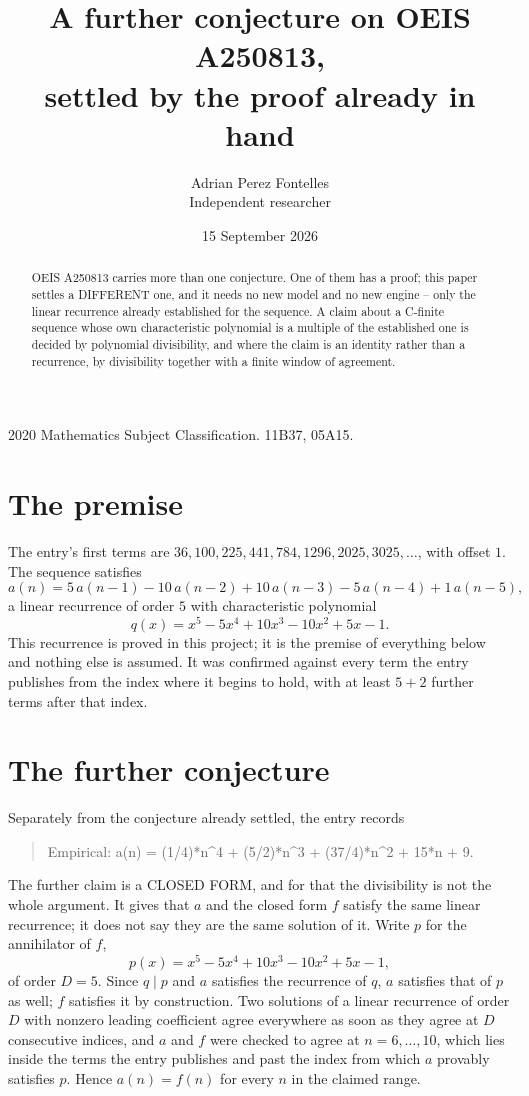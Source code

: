 \documentclass[11pt,a4paper]{article}
\title{A further conjecture on OEIS A250813,\\ \large settled by the proof already in hand}
\author{Adrian Perez Fontelles\\ \small Independent researcher}
\date{15 September 2026}
\theoremstyle{plain}
\theoremstyle{definition}
\begin{document}
\maketitle

\begin{abstract}
OEIS A250813 carries more than one conjecture. One of them has a proof; this paper settles a
DIFFERENT one, and it needs no new model and no new engine -- only the linear recurrence already
established for the sequence. A claim about a C-finite sequence whose own characteristic
polynomial is a multiple of the established one is decided by polynomial divisibility, and where
the claim is an identity rather than a recurrence, by divisibility together with a finite window
of agreement.
\end{abstract}

\noindent\small 2020 Mathematics Subject Classification. 11B37, 05A15.\normalsize

\section{The premise}

The entry's first terms are $36, 100, 225, 441, 784, 1296, 2025, 3025,\dots$, with offset $1$. The sequence satisfies
\[
  a(n)=5\,a(n-1) - 10\,a(n-2) + 10\,a(n-3) - 5\,a(n-4) + 1\,a(n-5) ,
\]
a linear recurrence of order $5$ with characteristic polynomial
\[
  q(x)=x^{5} - 5 x^{4} + 10 x^{3} - 10 x^{2} + 5 x - 1 .
\]
This recurrence is proved in this project; it is the premise of everything below and nothing else is assumed.
It was confirmed against every term the entry publishes from the index where it begins to hold,
with at least $5+2$ further terms after that index.

\section{The further conjecture}

Separately from the conjecture already settled, the entry records

\begin{quote}\raggedright Empirical: a(n) = (1/4)*n\^{}4 + (5/2)*n\^{}3 + (37/4)*n\^{}2 + 15*n + 9.\end{quote}

The further claim is a CLOSED FORM, and for that the divisibility is not the whole argument. It
gives that $a$ and the closed form $f$ satisfy the same linear recurrence; it does not say they
are the same solution of it. Write $p$ for the annihilator of $f$,
\[
  p(x)=x^{5} - 5 x^{4} + 10 x^{3} - 10 x^{2} + 5 x - 1 ,
\]
of order $D=5$. Since $q\mid p$ and $a$ satisfies the recurrence of $q$, $a$ satisfies that of
$p$ as well; $f$ satisfies it by construction. Two solutions of a linear recurrence of order $D$
with nonzero leading coefficient agree everywhere as soon as they agree at $D$ consecutive
indices, and $a$ and $f$ were checked to agree at $n=6,\dots,10$,
which lies inside the terms the entry publishes and past the index from which $a$ provably
satisfies $p$. Hence $a(n)=f(n)$ for every $n$ in the claimed range.
\end{document}
